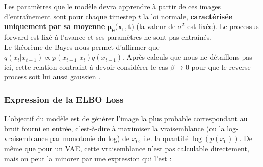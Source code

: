 \documentclass{article}
\begin{document}
Les paramètres que le modèle devra apprendre à partir de ces images d'entraînement sont pour chaque timestep $t$ la loi normale, \textbf{caractérisée uniquement par sa moyenne} $\boldsymbol{\mu_\theta(x_t,t})$ (la valeur de  $\sigma^2$ est fixée). Le processus forward est fixé à l'avance et ses paramètres ne sont pas entraînés. \\
Le théorème de Bayes nous permet d'affirmer que $q(x_t|x_{t-1}) \propto p(x_{t-1}|x_t)q(x_{t-1})$. Après calculs que nous ne détaillons pas ici, cette relation contraint à devoir considérer le cas $\beta \longrightarrow 0$ pour que le reverse process soit lui aussi gaussien \cite{FELLER}.

\subsubsection{Expression de la ELBO Loss}
L'objectif du modèle est de générer l'image la plus probable correspondant au bruit fourni en entrée, c'est-à-dire à maximiser la vraisemblance (ou la log-vraisemblance par monotonie du log) de $x_0$, i.e. la quantité $\log(p(x_0))$. De même que pour un VAE, cette vraisemblance n'est pas calculable directement, mais on peut la minorer par une expression qui l'est :
\end{document}
